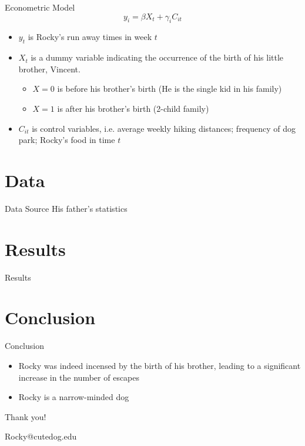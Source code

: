 \documentclass[10pt, xcolor=x11names,compress]{beamer}
\begin{document}
\begin{frame}{Econometric Model}
$$
y_{i}=\beta X_{t}+\gamma_{i} C_{it}
$$
\begin{itemize}
 \item $y_{t}$ is Rocky's run away times in week $t$
 \item $X_{t}$ is a dummy variable indicating the occurrence of the birth of his little brother, Vincent.
    \begin{itemize}
        \item $X=0$ is before his brother's birth (He is the single kid in his family)
        \item $X=1$ is after his brother's birth (2-child family)
    \end{itemize}
 \item $C_{i t}$ is control variables, i.e. average weekly hiking distances; frequency of dog park; Rocky's food in time $t$ 

\end{itemize}
\end{frame}


\section{Data}
\begin{frame}{Data Source}
His father's statistics
   
\end{frame}

\section{Results}
\begin{frame}{Results}

\end{frame}

\section{Conclusion}
\begin{frame}{Conclusion}
\begin{itemize}
    \item Rocky was indeed incensed by the birth of his brother, leading to a significant increase in the number of escapes
    \item  Rocky is a narrow-minded dog
\end{itemize}
    
\end{frame}


\begin{frame}
 \begin{center}
		{\Huge Thank you!}\\
		\bigskip\bigskip %
		
		{\LARGE Rocky@cutedog.edu}
		
	\end{center}
\end{frame}
\end{document}
